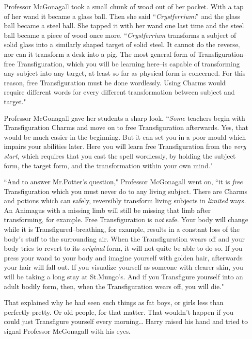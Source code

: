Professor McGonagall took a small chunk of wood out of her pocket. With a tap of her wand it became a glass ball. Then she said ``\emph{Crystferrium!}" and the glass ball became a steel ball. She tapped it with her wand one last time and the steel ball became a piece of wood once more. ``\emph{Crystferrium} transforms a subject of solid glass into a similarly shaped target of solid steel. It cannot do the reverse, nor can it transform a desk into a pig. The most general form of Transfiguration\---free Transfiguration, which you will be learning here\---is capable of transforming any subject into any target, at least so far as physical form is concerned. For this reason, free Transfiguration must be done wordlessly. Using Charms would require different words for every different transformation between subject and target."

Professor McGonagall gave her students a sharp look. ``\emph{Some} teachers begin with Transfiguration Charms and move on to free Transfiguration afterwards. Yes, that would be much easier in the beginning. But it can set you in a poor mould which impairs your abilities later. Here you will learn free Transfiguration from the \emph{very start}, which requires that you cast the spell wordlessly, by holding the subject form, the target form, and the transformation within your own mind."

``And to answer Mr.\?Potter's question," Professor McGonagall went on, ``it is \emph{free} Transfiguration which you must never do to any living subject. There are Charms and potions which can safely, reversibly transform living subjects in \emph{limited} ways. An Animagus with a missing limb will still be missing that limb after transforming, for example. Free Transfiguration is \emph{not} safe. Your body will change while it is Transfigured\---breathing, for example, results in a constant loss of the body's stuff to the surrounding air. When the Transfiguration wears off and your body tries to revert to its \emph{original} form, it will not quite be able to do so. If you press your wand to your body and imagine yourself with golden hair, afterwards your hair will fall out. If you visualize yourself as someone with clearer skin, you will be taking a long stay at St.\?Mungo's. And if you Transfigure yourself into an adult bodily form, then, when the Transfiguration wears off, you will die."

That explained why he had seen such things as fat boys, or girls less than perfectly pretty. Or old people, for that matter. That wouldn't happen if you could just Transfigure yourself every morning{\ldots} Harry raised his hand and tried to signal Professor McGonagall with his eyes.

